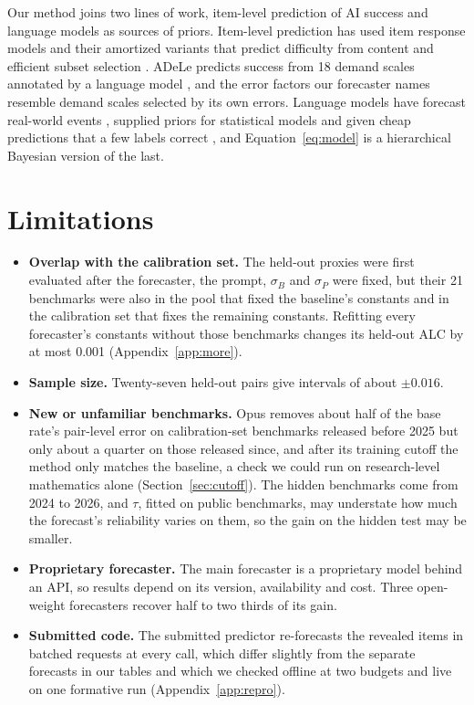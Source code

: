 \documentclass{article}
\begin{document}
Our method joins two lines of work, item-level prediction of AI success and language models as sources of priors. Item-level prediction has used item response models and their amortized variants that predict difficulty from content \cite{lord1980irt, rodriguez2021evaluation, truong2025amortized, jiang2026irt} and efficient subset selection \cite{polo2024tiny, zhang2025fewer}. ADeLe predicts success from 18 demand scales annotated by a language model \cite{zhou2026adele}, and the error factors our forecaster names resemble demand scales selected by its own errors. Language models have forecast real-world events \cite{halawi2024forecasting}, supplied priors for statistical models \cite{capstick2024autoelicit} and given cheap predictions that a few labels correct \cite{angelopoulos2023ppi}, and Equation~\eqref{eq:model} is a hierarchical Bayesian version of the last.

\section{Limitations}
\label{sec:limits}

\begin{itemize}
  \item \textbf{Overlap with the calibration set.} The held-out proxies were first evaluated after the forecaster, the prompt, $\sigma_B$ and $\sigma_P$ were fixed, but their 21 benchmarks were also in the pool that fixed the baseline's constants and in the calibration set that fixes the remaining constants. Refitting every forecaster's constants without those benchmarks changes its held-out ALC by at most 0.001 (Appendix~\ref{app:more}).
  \item \textbf{Sample size.} Twenty-seven held-out pairs give intervals of about $\pm 0.016$.
  \item \textbf{New or unfamiliar benchmarks.} Opus removes about half of the base rate's pair-level error on calibration-set benchmarks released before 2025 but only about a quarter on those released since, and after its training cutoff the method only matches the baseline, a check we could run on research-level mathematics alone (Section~\ref{sec:cutoff}). The hidden benchmarks come from 2024 to 2026, and $\tau$, fitted on public benchmarks, may understate how much the forecast's reliability varies on them, so the gain on the hidden test may be smaller.
  \item \textbf{Proprietary forecaster.} The main forecaster is a proprietary model behind an API, so results depend on its version, availability and cost. Three open-weight forecasters recover half to two thirds of its gain.
  \item \textbf{Submitted code.} The submitted predictor re-forecasts the revealed items in batched requests at every call, which differ slightly from the separate forecasts in our tables and which we checked offline at two budgets and live on one formative run (Appendix~\ref{app:repro}).
\end{itemize}
\end{document}
